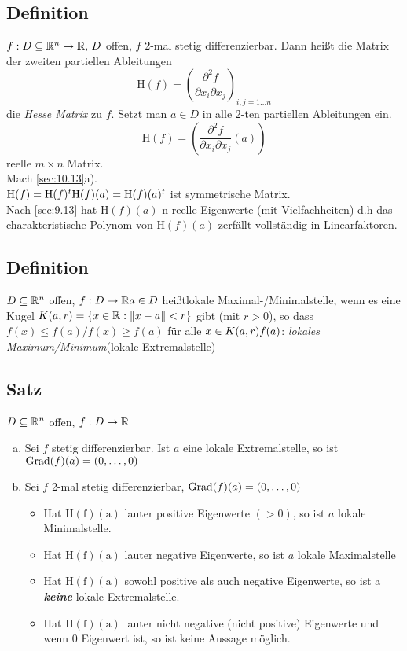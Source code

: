 \subsection{Definition}\label{sec:\thesubsection}
$f : D \subseteq \mathbb{R}^n \to \mathbb{R},\, D$ offen, $f$ 2-mal stetig differenzierbar. Dann hei\ss t die Matrix der zweiten partiellen Ableitungen
\[\mathrm{H}(f) = \left( \frac{\partial^2 f}{\partial x_i \partial x_j}  \right)_{i,j = 1\ldots n} \]
die \emph{Hesse Matrix} zu $f$. Setzt man $a \in D$ in alle 2-ten partiellen Ableitungen ein.
\[ \mathrm{H}(f) = \left( \frac{\partial^2 f}{\partial x_i \partial x_j}(a)  \right) \]
reelle $m \times n$ Matrix.\\
Mach \ref{sec:10.13}a).\\
$\mathrm{H}(f) = \mathrm{H}(f)^t\\
\mathrm{H}(f)(a) = \mathrm{H}(f)(a)^t$ ist symmetrische Matrix.\\
Nach \ref{sec:9.13} hat $\mathrm{H}(f)(a)$ n reelle Eigenwerte (mit Vielfachheiten) d.h das charakteristische Polynom von $\mathrm{H}(f)(a)$ zerfällt vollständig in Linearfaktoren.
\subsection{Definition}\label{sec:\thesubsection}
$D \subseteq \mathbb{R}^n$ offen, $f : D \to \mathbb{R}\\
a \in D$ hei\ss tlokale Maximal-/Minimalstelle, wenn es eine Kugel $K(a,r) = \{x \in \mathbb{R} : \Vert x-a\Vert <r \}$ gibt (mit $r > 0$), so dass $f(x) \leq f(a) / f(x) \geq f(a)$ für alle $ x \in K(a,r)\\
f(a)$: \emph{lokales Maximum/Minimum}(lokale Extremalstelle)
\subsection{Satz}\label{sec:\thesubsection}
$D \subseteq \mathbb{R}^n$ offen, $f : D \to \mathbb{R}$
\begin{enumerate}[a)]
\item Sei $f$ stetig differenzierbar. Ist $a$ eine lokale Extremalstelle, so ist $\operatorname{Grad}(f)(a) = (0,\ldots,0)$
\item Sei $f$ 2-mal stetig differenzierbar, $\operatorname{Grad}(f)(a) = (0,\ldots,0)$
\begin{itemize}
\item Hat $\mathrm{H(f)(a)}$ lauter positive Eigenwerte $(> 0)$, so ist $a$ lokale Minimalstelle.
\item Hat $\mathrm{H(f)(a)}$ lauter negative Eigenwerte, so ist $a$ lokale Maximalstelle
\item Hat $\mathrm{H(f)(a)}$ sowohl positive als auch negative Eigenwerte, so ist a \emph{\bf keine} lokale Extremalstelle.
\item Hat $\mathrm{H(f)(a)}$ lauter nicht negative (nicht positive) Eigenwerte und wenn 0 Eigenwert ist, so ist keine Aussage möglich.
\end{itemize}
\end{enumerate}
